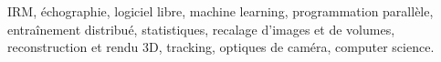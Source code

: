 




IRM, échographie, logiciel libre, machine learning, programmation parallèle, entraînement distribué, statistiques, recalage d'images et de volumes, reconstruction et rendu 3D, tracking, optiques de caméra, computer science.


